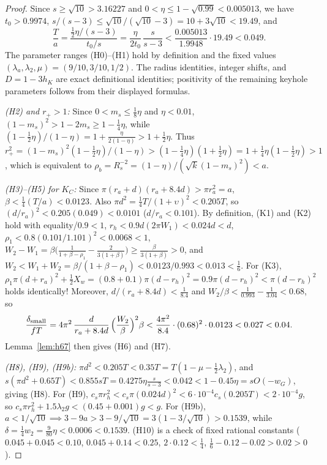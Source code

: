 \begin{proof}
Since $s\ge\sqrt{10}>3.16227$ and $0<\eta\le1-\sqrt{0.99}<0.005013$, we have $t_0>0.9974$,
$s/(s-3)\le\sqrt{10}/(\sqrt{10}-3)=10+3\sqrt{10}<19.49$, and
\[
 \frac{T}{a} = \frac{\frac12\eta/(s-3)}{t_0/s} = \frac{\eta}{2t_0}\,\frac{s}{s-3}
 < \frac{0.005013}{1.9948}\cdot 19.49 < 0.049.
\]
The parameter ranges (H0)--(H1) hold by definition and the fixed values
$(\lambda_a,\lambda_2,\mu)=(9/10,3/10,1/2)$. The radius identities, integer shifts, and $D=1-3h_K$ are exact
definitional identities; positivity of the remaining keyhole parameters follows from their displayed formulas.

\emph{(H2) and $r_+>1$:} Since $0<m_s\le\frac18\eta$ and $\eta<0.01$, $(1-m_s)^2>1-2m_s\ge1-\frac14\eta$, while
$(1-\frac12\eta)/(1-\eta)=1+\frac{\eta}{2(1-\eta)}>1+\frac12\eta$. Thus
$r_+^2=(1-m_s)^2(1-\frac12\eta)/(1-\eta)>(1-\frac14\eta)(1+\frac12\eta)=1+\frac14\eta(1-\frac12\eta)>1$, which is
equivalent to $\rho_b=R_s^{-2}=(1-\eta)/(\sqrt k(1-m_s)^2)<a$.

\emph{(H3)--(H5) for $K_C$:} Since $\pi(r_a+d)(r_a+8.4d)>\pi r_a^2=a$, $\beta<\frac14(T/a)<0.0123$. Also
$\pi d^2=\frac14T/(1+\upsilon)^2<0.205T$, so $(d/r_a)^2<0.205(0.049)<0.0101$ ($d/r_a<0.101$). By definition, (K1) and
(K2) hold with equality/$0.9<1$, $r_h<0.9d(2\pi W_1)<0.024d<d$, $\rho_1<0.8(0.101/1.101)^2<0.0068<1$,
$W_2-W_1=\beta\bigl(\frac1{1+\beta-\rho_1}-\frac2{3(1+\beta)}\bigr)\ge\frac{\beta}{3(1+\beta)}>0$, and
$W_2<W_1+W_2=\beta/(1+\beta-\rho_1)<0.0123/0.993<0.013<\frac16$. For (K3),
$\rho_1\pi(d+r_a)^2+\frac12X_w=(0.8+0.1)\pi(d-r_h)^2=0.9\pi(d-r_h)^2<\pi(d-r_h)^2$ holds identically! Moreover,
$d/(r_a+8.4d)<\frac1{8.4}$ and $W_2/\beta<\frac1{0.993}-\frac1{3.04}<0.68$, so
\[
 \frac{\delta_{\mathrm{small}}}{fT} = 4\pi^2\,\frac{d}{r_a+8.4d}\,\Bigl(\frac{W_2}{\beta}\Bigr)^2\beta
 < \frac{4\pi^2}{8.4}\cdot(0.68)^2\cdot 0.0123 < 0.027 < 0.04.
\]
Lemma~\ref{lem:h67} then gives (H6) and (H7).

\emph{(H8), (H9), (H9b):} $\pi d^2<0.205T<0.35T=T(1-\mu-\frac12\lambda_2)$, and
$s(\pi d^2+0.65T)<0.855sT=0.4275\eta\frac{s}{s-3}<0.042<1-0.45\eta=sO(-w_G)$, giving (H8). For (H9),
$c_s\pi r_h^2<c_s\pi(0.024d)^2<6\cdot10^{-4}c_s(0.205T)<2\cdot10^{-4}g$, so $c_s\pi r_h^2+1.5\lambda_2g<(0.45+0.001)g<g$.
For (H9b), $a<1/\sqrt{10}\implies 3-9a>3-9/\sqrt{10}=3(1-3/\sqrt{10})>0.1539$, while $\delta=\frac14w_2=\frac{9}{80}\eta<0.0006<0.1539$.
(H10) is a check of fixed rational constants ($0.045+0.045<0.10$, $0.045+0.14<0.25$, $2\cdot0.12<\frac14$,
$\frac16-0.12-0.02>0.02>0$).


\end{proof}
